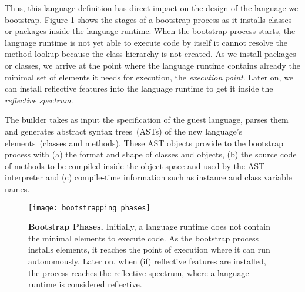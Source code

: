 Thus, this language definition has direct impact on the design of the language we bootstrap. Figure \ref{fig:phases} shows the stages of a bootstrap process as it installs classes or packages inside the language runtime. When the bootstrap process starts, the language runtime is not yet able to execute code by itself \eg it cannot resolve the method lookup because the class hierarchy is not created. As we install packages or classes, we arrive at the point where the language runtime contains already the minimal set of elements it needs for execution, the \emph{execution point}. Later on, we can install reflective features into the language runtime to get it inside the \emph{reflective spectrum}.


The builder takes as input the specification of the guest language, parses them and generates abstract syntax trees~(ASTs) of the new language's elements~(\eg classes and methods). 
These AST objects provide to the bootstrap process with (a) the format and shape of classes and objects, (b) the source code of methods to be compiled inside the object space and used by the AST interpreter and (c) compile-time information such as instance and class variable names.


\begin{figure}[ht]
\center
\texttt{[image: bootstrapping\_phases]}
\caption{\textbf{Bootstrap Phases.} Initially, a language runtime does not contain the minimal elements to execute code. As the bootstrap process installs elements, it reaches the point of execution where it can run autonomously. Later on, when (if) reflective features are installed, the process reaches the reflective spectrum, where a language runtime is considered reflective.\label{fig:phases}}
\end{figure}

%


